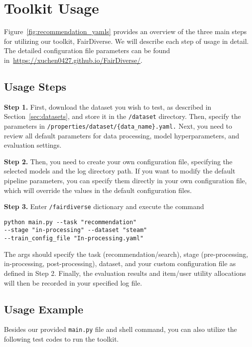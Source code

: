 \section{Toolkit Usage}






Figure~\ref{fig:recommendation_yamls} provides an overview of the three main steps for utilizing our toolkit, FairDiverse. We will describe each step of usage in detail. The detailed configuration file parameters can be found in~\url{https://xuchen0427.github.io/FairDiverse/}.

\subsection{Usage Steps}
\textbf{Step 1.} First, download the dataset you wish to test, as described in Section~\ref{sec:datasets}, and store it in the \texttt{/dataset} directory. Then, specify the parameters in \texttt{/properties/dataset/\{data\_name\}.yaml.}
Next, you need to review all default parameters for data processing, model hyperparameters, and evaluation settings.

\noindent\textbf{Step 2.} Then, you need to create your own configuration file, specifying the selected models and the log directory path. If you want to modify the default pipeline parameters, you can specify them directly in your own configuration file, which will override the values in the default configuration files.

\noindent\textbf{Step 3.} Enter \texttt{/fairdiverse} dictionary and execute the command

\begin{lstlisting}[style=shell]
python main.py --task "recommendation" 
--stage "in-processing" --dataset "steam" 
--train_config_file "In-processing.yaml"
\end{lstlisting}

\noindent%
The args should specify the task (recommendation/search), stage (pre-processing, in-processing, post-processing), dataset, and your custom configuration file as defined in Step 2. Finally, the evaluation results and item/user utility allocations will then be recorded in your specified log file.

\subsection{Usage Example}
Besides our provided \texttt{main.py} file and shell command, you can also utilize the following test codes to run the toolkit.

